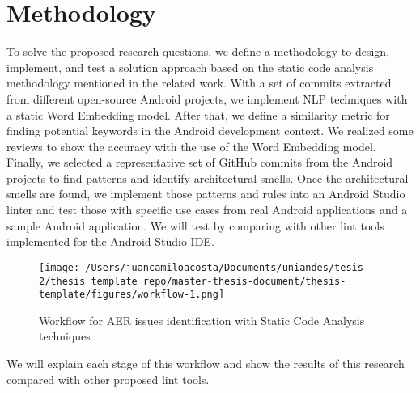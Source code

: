\section{Methodology}
To solve the proposed research questions, we define a methodology to design, implement, and test a solution approach based on the static code analysis methodology mentioned in the related work. With a set of commits extracted from different open-source Android projects, we implement NLP techniques with a static Word Embedding model. After that, we define a similarity metric for finding potential keywords in the Android development context. We realized some reviews to show the accuracy with the use of the Word Embedding model. Finally, we selected a representative set of GitHub commits from the Android projects to find patterns and identify architectural smells. Once the architectural smells are found, we implement those patterns and rules into an Android Studio linter and test those with specific use cases from real Android applications and a sample Android application. We will test by comparing with other lint tools implemented for the Android Studio IDE.

\begin{figure}[h]
    	\centering
    		\texttt{[image: /Users/juancamiloacosta/Documents/uniandes/tesis 2/thesis template repo/master-thesis-document/thesis-template/figures/workflow-1.png]}
   			 \caption{Workflow for AER issues identification with Static Code Analysis techniques}
   			 \label{fig:ast}
\end{figure}


We will explain each stage of this workflow and show the results of this research compared with other proposed lint tools.

